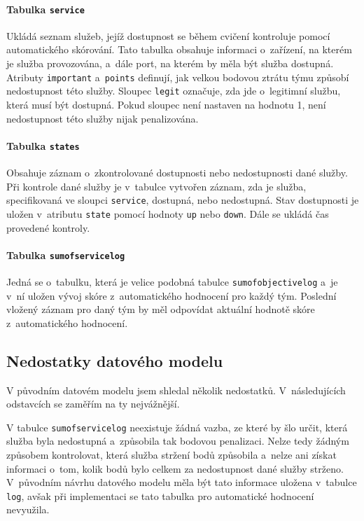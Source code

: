 \documentclass[
  digital,
  twoside,
  table, 
  nolof, 
  nolot
]{fithesis3}
\begin{document}
\paragraph{Tabulka \texttt{service}} Ukládá seznam služeb, jejíž dostupnost se během cvičení kontroluje pomocí automatického skórování. Tato tabulka obsahuje informaci o~zařízení, na kterém je služba provozována, a~dále port, na kterém by měla být služba dostupná. Atributy \texttt{important} a~\texttt{points} definují, jak velkou bodovou ztrátu týmu způsobí nedostupnost této služby. Sloupec \texttt{legit} označuje, zda jde o~legitimní službu, která musí být dostupná. Pokud sloupec není nastaven na hodnotu 1, není nedostupnost této služby nijak penalizována. 

\paragraph{Tabulka \texttt{states}} Obsahuje záznam o~zkontrolované dostupnosti nebo nedostupnosti dané služby. Při kontrole dané služby je v~tabulce vytvořen záznam, zda je služba, specifikovaná ve sloupci \texttt{service}, dostupná, nebo nedostupná. Stav dostupnosti je uložen v~atributu \texttt{state} pomocí hodnoty \texttt{up} nebo \texttt{down}. Dále se ukládá čas provedené kontroly.

\paragraph{Tabulka \texttt{sumofservicelog}} Jedná se o~tabulku, která je velice podobná tabulce \texttt{sumofobjectivelog} a~je v~ní uložen vývoj skóre z~automatického hodnocení pro každý tým. Poslední vložený záznam pro daný tým by měl odpovídat aktuální hodnotě skóre z~automatického hodnocení.

\subsection{Nedostatky datového modelu}

V původním datovém modelu jsem shledal několik nedostatků. V~následujících odstavcích se zaměřím na ty nejvážnější.

V tabulce \texttt{sumofservicelog} neexistuje žádná vazba, ze které by šlo určit, která služba byla nedostupná a~způsobila tak bodovou penalizaci. Nelze tedy žádným způsobem kontrolovat, která služba stržení bodů způsobila a~nelze ani získat informaci o~tom, kolik bodů bylo celkem za nedostupnost dané služby strženo. V~původním návrhu datového modelu měla být tato informace uložena v~tabulce \texttt{log}, avšak při implementaci se tato tabulka pro automatické hodnocení nevyužila. 
\end{document}
